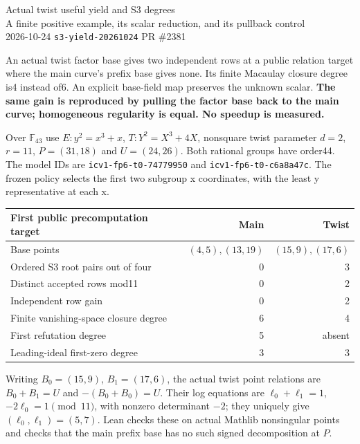 \documentclass[10pt,a4paper]{article}
\newcommand{\F}{\mathbb F}
\newcommand{\code}[1]{\texttt{#1}}
\begin{document}
\begin{center}
{\LARGE Actual twist useful yield and S3 degrees}\\[5pt]
{\large A finite positive example, its scalar reduction, and its pullback control}\\[4pt]
2026-10-24 \quad \code{s3-yield-20261024} \quad PR \#2381
\end{center}

An actual twist factor base gives two independent rows at a public relation
target where the main curve's prefix base gives none. Its finite Macaulay
closure degree is4 instead of6. An explicit base-field map preserves the
unknown scalar. \textbf{The same gain is reproduced by pulling the factor base
back to the main curve; homogeneous regularity is equal. No speedup is measured.}

Over $\F_{43}$ use $E:y^2=x^3+x$, $T:Y^2=X^3+4X$, nonsquare twist
parameter $d=2$, $r=11$, $P=(31,18)$ and $U=(24,26)$. Both rational groups
have order44. The model IDs are \code{icv1-fp6-t0-74779950} and
\code{icv1-fp6-t0-c6a8a47c}. The frozen policy selects the first two subgroup
x coordinates, with the least y representative at each x.

\begin{center}\small
\begin{tabular}{@{}p{74mm}rr@{}}\toprule
First public precomputation target & Main & Twist\\\midrule
Base points & $(4,5),(13,19)$ & $(15,9),(17,6)$\\
Ordered S3 root pairs out of four &0&3\\
Distinct accepted rows mod11 &0&2\\
Independent row gain &0&2\\
Finite vanishing-space closure degree &6&4\\
First refutation degree &5& absent\\
Leading-ideal first-zero degree &3&3\\\bottomrule
\end{tabular}\end{center}

Writing $B_0=(15,9)$, $B_1=(17,6)$, the actual twist point relations are
$B_0+B_1=U$ and $-(B_0+B_0)=U$. Their log equations are
$\ell_0+\ell_1=1$, $-2\ell_0=1\pmod {11}$, with nonzero determinant $-2$;
they uniquely give $(\ell_0,\ell_1)=(5,7)$. Lean checks these on actual
Mathlib nonsingular points and checks that the main prefix base has no such
signed decomposition at $P$.
\end{document}
